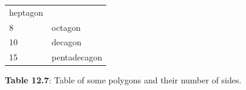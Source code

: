 {{\begin{center}
\begin{tabular}[t]{|l|l|}
        heptagon%
     \tabularnewline\cline{1-1}\cline{2-2}
        8 &
        octagon%
     \tabularnewline\cline{1-1}\cline{2-2}
        10 &
        decagon%
     \tabularnewline\cline{1-1}\cline{2-2}
        15 &
        pentadecagon%
     \tabularnewline\cline{1-1}\cline{2-2}
    \end{tabular}
      \end{center}
    \begin{center}{\small\bfseries Table 12.7}: Table of some polygons and their number of sides.\end{center}
          }{ %
        \begin{center}
      \label{m39368*uid92}
    \noindent
\end{center}}}
